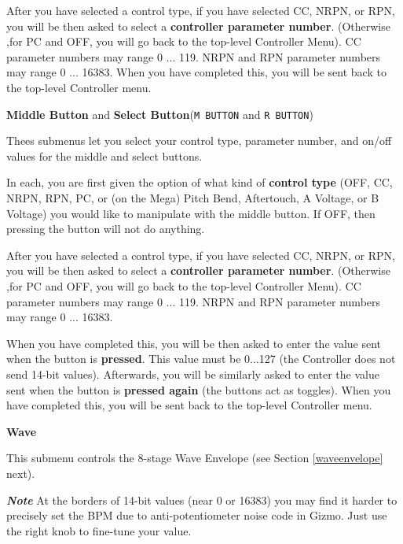 \documentclass{article}
\begin{document}
\begin{description}
	After you have selected a control type, if you have selected CC, NRPN, or RPN, you will be then asked to select a {\bf controller parameter number}.  (Otherwise ,for PC and OFF, you will go back to the top-level Controller Menu).  CC parameter numbers may range 0 ... 119.  NRPN and RPN parameter numbers may range 0 ... 16383. When you have completed this, you will be sent back to the top-level Controller menu.

	\item{\bf Middle Button} and {\bf Select Button}\quad (\texttt{M BUTTON} and \texttt{R BUTTON})
	
	Thees submenus let you select your control type, parameter number, and on/off values for the middle and select buttons.
	
	In each, you are first given the option of what kind of {\bf control type} (OFF, CC, NRPN, RPN, PC, or (on the Mega) Pitch Bend, Aftertouch, A Voltage, or B Voltage) you would like to manipulate with the middle button.  If OFF, then pressing the button will not do anything.

	After you have selected a control type, if you have selected CC, NRPN, or RPN, you will be then asked to select a {\bf controller parameter number}.  (Otherwise ,for PC and OFF, you will go back to the top-level Controller Menu).  CC parameter numbers may range 0 ... 119.  NRPN and RPN parameter numbers may range 0 ... 16383.
	
	When you have completed this, you will be then asked to enter the value sent when the button is {\bf pressed}.  This value must be 0...127 (the Controller does not send 14-bit values).  Afterwards, you will be similarly asked to enter the value sent when the button is {\bf pressed again} (the buttons act as toggles).  When you have completed this, you will be sent back to the top-level Controller menu.
	
	\item{\bf Wave}
	
	This submenu controls the 8-stage Wave Envelope (see Section \ref{waveenvelope} next).

		\item{\bf \textit{Note}} At the borders of 14-bit values (near 0 or 16383) you may find it harder to precisely set the BPM due to anti-potentiometer noise code in Gizmo. Just use the right knob to fine-tune your value. 
	\end{description}
	
\end{document}
